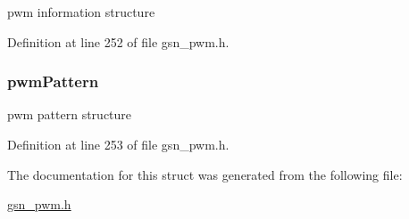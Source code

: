 pwm information structure 



Definition at line 252 of file gsn\_\-pwm.h.

\hypertarget{a00180_ac81f6e8f23a85b246aaa7e15f6fc7fdf}{
\subsubsection[{pwmPattern}]{ {\bf pwmPattern}}}
\label{a00180_ac81f6e8f23a85b246aaa7e15f6fc7fdf}


pwm pattern structure 



Definition at line 253 of file gsn\_\-pwm.h.



The documentation for this struct was generated from the following file:\begin{DoxyCompactItemize}
\item 
\hyperlink{a00540}{gsn\_\-pwm.h}\end{DoxyCompactItemize}
